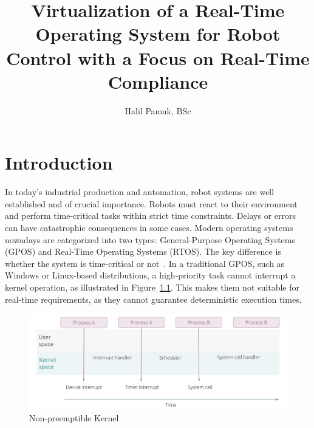 \documentclass[MMR,Master,english]{style/twbook}
\title{Virtualization of a Real-Time Operating System for Robot Control with a Focus on Real-Time Compliance}
\author{Halil Pamuk, BSc}
\begin{document}
\maketitle
%
%
%



\chapter{Introduction}\label{cha:introduction}
In today's industrial production and automation, robot systems are well established and of crucial importance. Robots must react to their environment and perform time-critical tasks within strict time constraints. Delays or errors can have catastrophic consequences in some cases. Modern operating systems nowadays are categorized into two types:  General-Purpose Operating Systems (GPOS) and Real-Time Operating Systems (RTOS). The key difference is whether the system is time-critical or not~\cite{canbazPerformanceAnalysisRealtime2022}. In a traditional GPOS, such as Windows or Linux-based distributions, a high-priority task cannot interrupt a kernel operation, as illustrated in Figure~\ref{fig:kernel_generic}. This makes them not suitable for real-time requirements, as they cannot guarantee deterministic execution times.

\begin{figure}[H]
	\centering
	\includegraphics[width=0.75\columnwidth]{img/introduction/kernel_generic.png}
	\caption[Non-preemptible Kernel]{Non-preemptible Kernel~\cite{WhatRealtimeLinux}}
	\label{fig:kernel_generic}
\end{figure}
\end{document}
